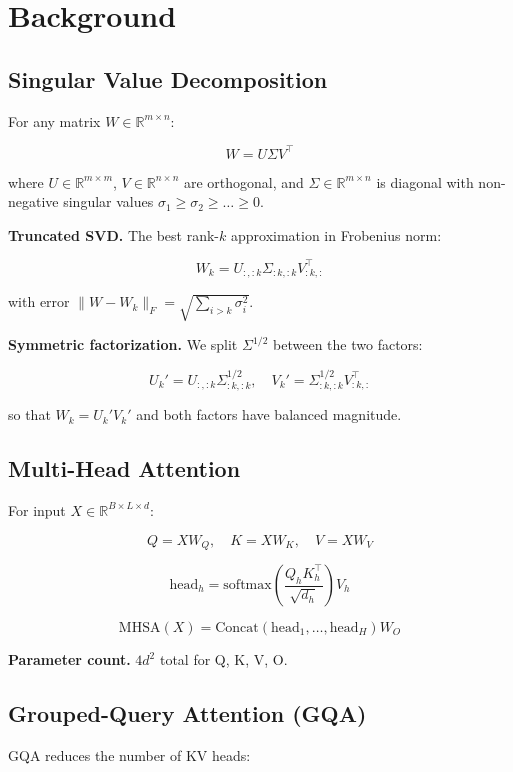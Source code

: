 \section{Background}

\subsection{Singular Value Decomposition}

For any matrix $W \in \mathbb{R}^{m \times n}$:

\[
W = U \Sigma V^\top
\]

where $U \in \mathbb{R}^{m \times m}$, $V \in \mathbb{R}^{n \times n}$ are 
orthogonal, and $\Sigma \in \mathbb{R}^{m \times n}$ is diagonal with 
non-negative singular values $\sigma_1 \geq \sigma_2 \geq \dots \geq 0$.

\textbf{Truncated SVD.} The best rank-$k$ approximation in Frobenius norm:

\[
W_k = U_{:, :k} \Sigma_{:k, :k} V_{:k, :}^\top
\]

with error $\|W - W_k\|_F = \sqrt{\sum_{i > k} \sigma_i^2}$.

\textbf{Symmetric factorization.} We split $\Sigma^{1/2}$ between the two factors:

\[
U_k' = U_{:, :k} \Sigma_{:k, :k}^{1/2}, \quad
V_k' = \Sigma_{:k, :k}^{1/2} V_{:k, :}^\top
\]

so that $W_k = U_k' V_k'$ and both factors have balanced magnitude.

\subsection{Multi-Head Attention}

For input $X \in \mathbb{R}^{B \times L \times d}$:

\[
Q = X W_Q, \quad K = X W_K, \quad V = X W_V
\]

\[
\text{head}_h = \text{softmax}\!\left(\frac{Q_h K_h^\top}{\sqrt{d_h}}\right) V_h
\]

\[
\text{MHSA}(X) = \text{Concat}(\text{head}_1, \dots, \text{head}_H) W_O
\]

\textbf{Parameter count.} $4 d^2$ total for Q, K, V, O.

\subsection{Grouped-Query Attention (GQA)}

GQA reduces the number of KV heads:

